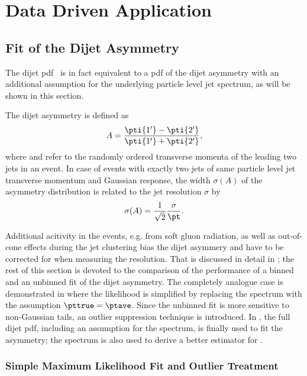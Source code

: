 \section{Data Driven Application}


\subsection{Fit of the Dijet Asymmetry}

The dijet pdf~ is in fact equivalent to a pdf of the dijet
asymmetry with an additional assumption for the underlying particle
level jet spectrum, as will be shown in this section.

The dijet asymmetry is defined as
\begin{equation}\label{eq:ResFit:Asymmetry}
  A = \frac{\pti{1'}-\pti{2'}}{\pti{1'}+\pti{2'}},
\end{equation}
where  and  refer to the randomly ordered transverse momenta of the
leading two jets in an event.
In case of events with exactly two jets of same particle level jet
transverse momentum \pt and Gaussian response, the width $\sigma(A)$ of the asymmetry distribution is
related to the jet \pt resolution $\sigma$ by
\begin{equation*}
  \sigma(A) = \frac{1}{\sqrt{2}}\frac{\sigma}{\pt}.
\end{equation*}

Additional acitivity in the events, e.g. from soft gluon radiation, as
well as out-of-cone effects during the jet clustering bias the dijet asymmery and have to be
corrected for when measuring the resolution.
That is discussed in detail in ; the rest of
this section is devoted to the comparison of the performance of a
binned and an unbinned fit of the dijet asymmetry.
The completely analogue case is demonstrated in
 where the likelihood is simplified by replacing the spectrum
with the assumption \mbox{$\pttrue = \ptave$}.
Since the unbinned fit is more sensitive to non-Gaussian tails, an outlier
suppression technique is introduced.
In , the full dijet pdf, including an assumption for the
spectrum, is finally used to fit the asymmetry;
the spectrum is also used to derive a better estimator for \ptgen.


\subsubsection{Simple Maximum Likelihood Fit and Outlier Treatment}\label{sec:ResFit:Asym:SimpleFit}

